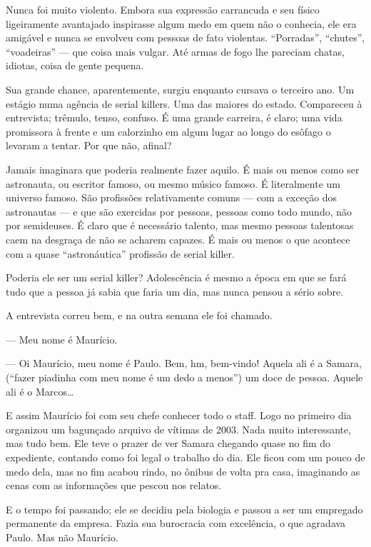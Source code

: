 Nunca foi muito violento. Embora sua expressão carrancuda e seu físico ligeiramente avantajado inspirasse algum medo em quem não o conhecia, ele era amigável e nunca se envolveu com pessoas de fato violentas. ``Porradas'', ``chutes'', ``voadeiras'' --- que coisa mais vulgar. Até armas de fogo lhe pareciam chatas, idiotas, coisa de gente pequena.

Sua grande chance, aparentemente, surgiu enquanto cursava o terceiro ano. Um estágio numa agência de serial killers. Uma das maiores do estado. Compareceu à entrevista; trêmulo, tenso, confuso. É uma grande carreira, é claro; uma vida promissora à frente e um calorzinho em algum lugar ao longo do esôfago o levaram a tentar. Por que não, afinal?

Jamais imaginara que poderia realmente fazer aquilo. É mais ou menos como ser astronauta, ou escritor famoso, ou mesmo músico famoso. É literalmente um universo famoso. São profissões relativamente comuns --- com a exceção dos astronautas --- e que são exercidas por pessoas, pessoas como todo mundo, não por semideuses. É claro que é necessário talento, mas mesmo pessoas talentosas caem na desgraça de não se acharem capazes. É mais ou menos o que acontece com a quase ``astronáutica'' profissão de serial killer.

Poderia ele ser um serial killer? Adolescência é mesmo a época em que se fará tudo que a pessoa já sabia que faria um dia, mas nunca pensou a sério sobre.

A entrevista correu bem, e na outra semana ele foi cha\-ma\-do.

--- Meu nome é Maurício.

--- Oi Maurício, meu nome é Paulo. Bem, hm, bem-vindo! Aquela ali é a Samara, (``fazer piadinha com meu nome é um dedo a menos'') um doce de pessoa. Aquele ali é o Marcos\ldots

E assim Maurício foi com seu chefe conhecer todo o staff. Logo no primeiro dia organizou um bagunçado arquivo de vítimas de 2003. Nada muito interessante, mas tudo bem. Ele teve o prazer de ver Samara chegando quase no fim do expediente, contando como foi legal o trabalho do dia. Ele ficou com um pouco de medo dela, mas no fim acabou rindo, no ônibus de volta pra casa, imaginando as cenas com as informações que pescou nos relatos.

E o tempo foi passando; ele se decidiu pela biologia e passou a ser um empregado permanente da empresa. Fazia sua burocracia com excelência, o que agradava Paulo. Mas não Maurício.

